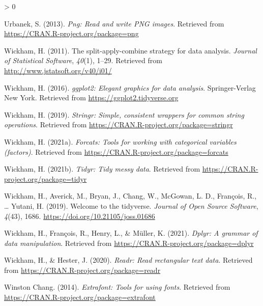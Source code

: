 \documentclass[
  english,
  man,floatsintext]{apa6}
\newlength{\cslhangindent}
\newenvironment{CSLReferences}[2] %
 {%
  \setlength{\parindent}{0pt}
  \ifodd #1 \everypar{\setlength{\hangindent}{\cslhangindent}}\ignorespaces\fi
  \ifnum #2 > 0
  \setlength{\parskip}{#2\baselineskip}
  \fi
 }%
 {}
\begin{document}
\begin{CSLReferences}{1}{0}
\leavevmode\hypertarget{ref-R-png}{}%
Urbanek, S. (2013). \emph{Png: Read and write PNG images}. Retrieved from \url{https://CRAN.R-project.org/package=png}

\leavevmode\hypertarget{ref-R-plyr}{}%
Wickham, H. (2011). The split-apply-combine strategy for data analysis. \emph{Journal of Statistical Software}, \emph{40}(1), 1--29. Retrieved from \url{http://www.jstatsoft.org/v40/i01/}

\leavevmode\hypertarget{ref-R-ggplot2}{}%
Wickham, H. (2016). \emph{ggplot2: Elegant graphics for data analysis}. Springer-Verlag New York. Retrieved from \url{https://ggplot2.tidyverse.org}

\leavevmode\hypertarget{ref-R-stringr}{}%
Wickham, H. (2019). \emph{Stringr: Simple, consistent wrappers for common string operations}. Retrieved from \url{https://CRAN.R-project.org/package=stringr}

\leavevmode\hypertarget{ref-R-forcats}{}%
Wickham, H. (2021a). \emph{Forcats: Tools for working with categorical variables (factors)}. Retrieved from \url{https://CRAN.R-project.org/package=forcats}

\leavevmode\hypertarget{ref-R-tidyr}{}%
Wickham, H. (2021b). \emph{Tidyr: Tidy messy data}. Retrieved from \url{https://CRAN.R-project.org/package=tidyr}

\leavevmode\hypertarget{ref-R-tidyverse}{}%
Wickham, H., Averick, M., Bryan, J., Chang, W., McGowan, L. D., François, R., \ldots{} Yutani, H. (2019). Welcome to the {tidyverse}. \emph{Journal of Open Source Software}, \emph{4}(43), 1686. \url{https://doi.org/10.21105/joss.01686}

\leavevmode\hypertarget{ref-R-dplyr}{}%
Wickham, H., François, R., Henry, L., \& Müller, K. (2021). \emph{Dplyr: A grammar of data manipulation}. Retrieved from \url{https://CRAN.R-project.org/package=dplyr}

\leavevmode\hypertarget{ref-R-readr}{}%
Wickham, H., \& Hester, J. (2020). \emph{Readr: Read rectangular text data}. Retrieved from \url{https://CRAN.R-project.org/package=readr}

\leavevmode\hypertarget{ref-R-extrafont}{}%
Winston Chang. (2014). \emph{Extrafont: Tools for using fonts}. Retrieved from \url{https://CRAN.R-project.org/package=extrafont}

\end{CSLReferences}

\endgroup
\end{document}

